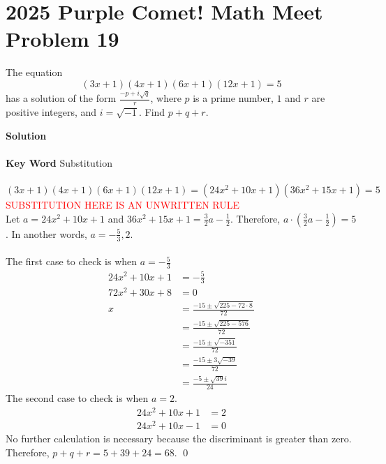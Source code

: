 \documentclass{article}
\newenvironment{solution}{\begin{trivlist}\item[]{\bf Solution}}{\qed \end{trivlist}}
\begin{document}
\newpage
\section*{2025 Purple Comet! Math Meet Problem 19}
The equation
\[
(3x+1)(4x+1)(6x+1)(12x+1)=5
\]
has a solution of the form $\frac{-p+i\sqrt{q}}{r}$, where $p$ is a prime number, $1$ and $r$ are positive integers, and $i=\sqrt{-1}$. Find $p+q+r$.
\begin{solution}
\\\\
\textbf{Key Word} Substitution
\\\\
\[
(3x+1)(4x+1)(6x+1)(12x+1)=(24x^2+10x+1)(36x^2+15x+1)=5
\]
\textcolor{red}{SUBSTITUTION HERE IS AN UNWRITTEN RULE} \\
Let $a=24x^2+10x+1$ and $36x^2+15x+1=\frac{3}{2}a-\frac{1}{2}$. Therefore, $a\cdot\left(\frac{3}{2}a-\frac{1}{2}\right)=5$. In another words, $a=-\frac{5}{3},2$.
\\\\
The first case to check is when $a=-\frac{5}{3}$
\begin{align*}
24x^2+10x+1&=-\frac{5}{3} \\
72x^2+30x+8&=0 \\
x&=\frac{-15\pm\sqrt{225-72\cdot8}}{72} \\
&=\frac{-15\pm\sqrt{225-576}}{72} \\
&=\frac{-15\pm\sqrt{-351}}{72} \\
&=\frac{-15\pm3\sqrt{-39}}{72} \\
&=\frac{-5\pm\sqrt{39}i}{24}
\end{align*}
\noindent
The second case to check is when $a=2$.
\begin{align*}
24x^2+10x+1&=2 \\
24x^2+10x-1&=0
\end{align*}
No further calculation is necessary because the discriminant is greater than zero. Therefore, $p+q+r=5+39+24=\boxed{68}$.
\end{solution}

\newpage
\end{document}
